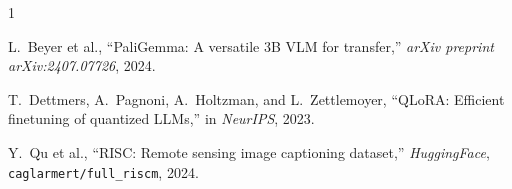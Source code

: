 \documentclass[conference]{IEEEtran}
\begin{document}
\balance

{\small
\begin{thebibliography}{1}

L.~Beyer et al.,
``PaliGemma: A versatile 3B VLM for transfer,''
\textit{arXiv preprint arXiv:2407.07726}, 2024.

T.~Dettmers, A.~Pagnoni, A.~Holtzman, and L.~Zettlemoyer,
``QLoRA: Efficient finetuning of quantized LLMs,''
in \textit{NeurIPS}, 2023.

Y.~Qu et al.,
``RISC: Remote sensing image captioning dataset,''
\textit{HuggingFace}, \texttt{caglarmert/full\_riscm}, 2024.

\end{thebibliography}
}
\end{document}
